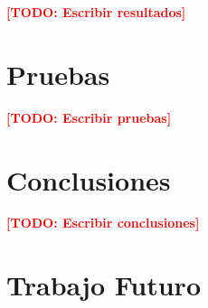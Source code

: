 \documentclass[12pt, letterpaper, oneside]{article}
\newcommand{\TODO}[1]{\textcolor{red}{\textbf{[TODO: #1]}}}
\begin{document}
\TODO{Escribir resultados}


\section{Pruebas}
\label{sec:pruebas}


\TODO{Escribir pruebas}


\section{Conclusiones}
\label{sec:conclusiones}


\TODO{Escribir conclusiones}


\section{Trabajo Futuro}
\label{sec:trabajo-futuro}
\end{document}

